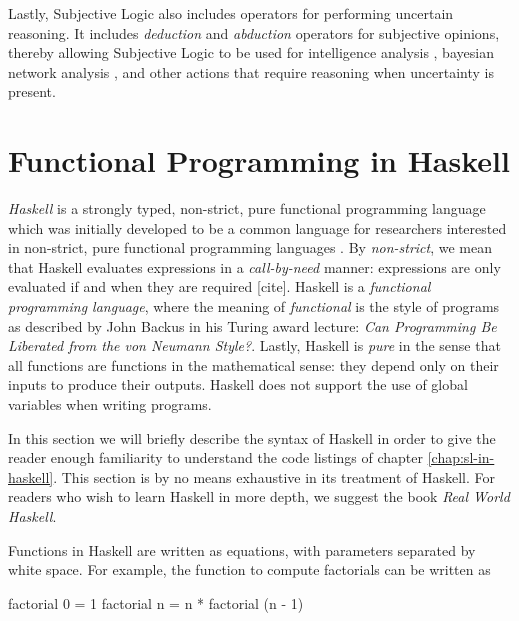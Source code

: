 \documentclass[thesis.tex]{subfiles}
\begin{document}
Lastly, Subjective Logic also includes operators for performing uncertain reasoning. It includes
\emph{deduction} and \emph{abduction} operators for subjective opinions, thereby allowing Subjective
Logic to be used for intelligence analysis \cite{pope2005analysis},
bayesian network analysis \cite{josang2008conditional}, and other actions that
require reasoning when uncertainty is present.










\section{Functional Programming in Haskell}

\emph{Haskell} is a strongly typed, non-strict, pure functional
programming language \cite{hudak1992report} which was initially
developed to be a common language for researchers interested in
non-strict, pure functional programming languages
\cite{hudak2007history}.
By \emph{non-strict}, we mean that Haskell
evaluates expressions in a \emph{call-by-need} manner: expressions are
only evaluated if and when they are required [cite]. Haskell is a
\emph{functional programming language}, where the meaning of
\emph{functional} is the style of programs as described by John Backus
in his Turing award lecture: \emph{Can Programming Be Liberated from
  the von Neumann Style?}\cite{backus1978can}.  Lastly, Haskell is
\emph{pure} in the sense that all functions are functions in the
mathematical sense: they depend only on their inputs to produce their
outputs. Haskell does not support the use of global variables when
writing programs.

In this section we will briefly describe the syntax of Haskell in
order to give the reader enough familiarity to understand the code
listings of chapter \ref{chap:sl-in-haskell}. This section is by no
means exhaustive in its treatment of Haskell. For readers who wish to
learn Haskell in more depth, we suggest the book \emph{Real World
  Haskell}.

Functions in Haskell are written as equations, with parameters separated
by white space. For example, the function to compute factorials can be
written as

\begin{spec}
factorial 0 = 1
factorial n = n * factorial (n - 1)
\end{spec}
\end{document}
